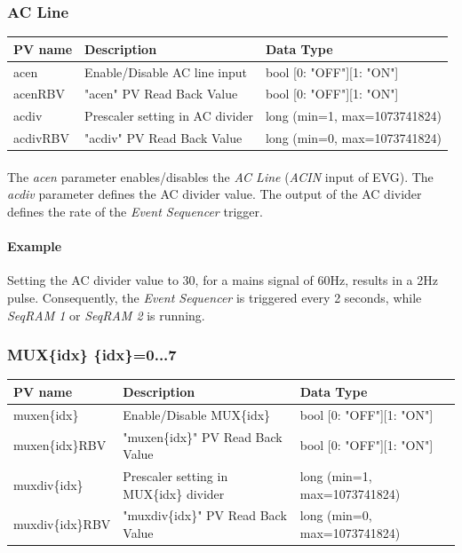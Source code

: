 \documentclass[openany]{article}
\begin{document}
		\subsubsection{AC Line}\label{pvgroup:evg-acline}
			\begin{center}
			\begin{tabular}{| m{2.8cm} m{6cm} m{6cm} |}
			    \hline
			    \bfseries PV name & \bfseries Description & \bfseries Data Type \\ \hline
			    acen & Enable/Disable AC line input & bool [0: "OFF"][1: "ON"] \\ \hline
			    acenRBV & "acen" PV Read Back Value & bool [0: "OFF"][1: "ON"] \\ \hline
			    acdiv & Prescaler setting in AC divider & long (min=1, max=1073741824) \\ \hline
			    acdivRBV & "acdiv" PV Read Back Value & long (min=0, max=1073741824)\\ \hline
			\end{tabular}
			\end{center}

			\paragraph{} The \emph{acen} parameter enables/disables the \emph{AC Line} (\emph{ACIN} input of EVG). The \emph{acdiv} parameter defines the AC divider value. The output of the AC divider defines the rate of the \emph{Event Sequencer} trigger. 
			\paragraph{Example} Setting the AC divider value to 30, for a mains signal of 60Hz, results in a 2Hz pulse. Consequently, the \emph{Event Sequencer} is triggered every 2 seconds, while \emph{SeqRAM 1} or \emph{SeqRAM 2} is running.

		\subsubsection{MUX\{idx\} \{idx\}=0...7}\label{pvgroup:evg-mux}
			\begin{center}
			\begin{tabular}{| m{2.8cm} m{6cm} m{6cm} |}
			    \hline
			    \bfseries PV name & \bfseries Description & \bfseries Data Type \\ \hline
			    muxen\{idx\} & Enable/Disable MUX\{idx\} & bool [0: "OFF"][1: "ON"] \\ \hline
			    muxen\{idx\}RBV & "muxen\{idx\}" PV Read Back Value & bool [0: "OFF"][1: "ON"] \\ \hline
			    muxdiv\{idx\} & Prescaler setting in MUX\{idx\} divider & long (min=1, max=1073741824) \\ \hline
			    muxdiv\{idx\}RBV & "muxdiv\{idx\}" PV Read Back Value & long (min=0, max=1073741824)\\ \hline
			\end{tabular}
			\end{center}
\end{document}
